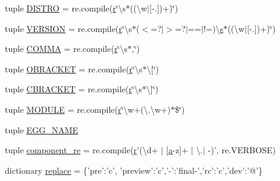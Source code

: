 \begin{DoxyCompactItemize}
\item 
tuple \hyperlink{namespacepkg__resources_a33f8e662c7503913abc27fd1b4005d31}{D\+I\+S\+T\+R\+O} = re.\+compile(\hyperlink{indexexpr_8h_ac434fd11cc2493608d8d91424d60c17e}{r}\char`\"{}\textbackslash{}s$\ast$((\textbackslash{}w$\vert$\mbox{[}-\/.\mbox{]})+)\char`\"{})
\item 
tuple \hyperlink{namespacepkg__resources_a74c55e2ef7e84f92141094b05d526991}{V\+E\+R\+S\+I\+O\+N} = re.\+compile(\hyperlink{indexexpr_8h_ac434fd11cc2493608d8d91424d60c17e}{r}\char`\"{}\textbackslash{}s$\ast$($<$=?$\vert$$>$=?$\vert$==$\vert$!=)\textbackslash{}\hyperlink{indexexpr_8h_ae024b0db549122b44c349ae28ec990dc}{s}$\ast$((\textbackslash{}w$\vert$\mbox{[}-\/.\mbox{]})+)\char`\"{})
\item 
tuple \hyperlink{namespacepkg__resources_aaa98f1116821e21c7cc32afb9071abb5}{C\+O\+M\+M\+A} = re.\+compile(\hyperlink{indexexpr_8h_ac434fd11cc2493608d8d91424d60c17e}{r}\char`\"{}\textbackslash{}s$\ast$,\char`\"{})
\item 
tuple \hyperlink{namespacepkg__resources_a47cc940535c52e3219e4f740dde2e617}{O\+B\+R\+A\+C\+K\+E\+T} = re.\+compile(\hyperlink{indexexpr_8h_ac434fd11cc2493608d8d91424d60c17e}{r}\char`\"{}\textbackslash{}s$\ast$\textbackslash{}\mbox{[}\char`\"{})
\item 
tuple \hyperlink{namespacepkg__resources_a851dada64542fc49accad5eefbd0b310}{C\+B\+R\+A\+C\+K\+E\+T} = re.\+compile(\hyperlink{indexexpr_8h_ac434fd11cc2493608d8d91424d60c17e}{r}\char`\"{}\textbackslash{}s$\ast$\textbackslash{}\mbox{]}\char`\"{})
\item 
tuple \hyperlink{namespacepkg__resources_aee0791fb8fdb71ab7dc8e286061fbf45}{M\+O\+D\+U\+L\+E} = re.\+compile(\hyperlink{indexexpr_8h_ac434fd11cc2493608d8d91424d60c17e}{r}\char`\"{}\textbackslash{}w+(\textbackslash{}.\textbackslash{}w+)$\ast$\$\char`\"{})
\item 
tuple \hyperlink{namespacepkg__resources_aeabc4fefd5622d5295b6a9230c3f866d}{E\+G\+G\+\_\+\+N\+A\+M\+E}
\item 
tuple \hyperlink{namespacepkg__resources_a8ea25986750b23a826922f840a1f11f3}{component\+\_\+re} = re.\+compile(\hyperlink{indexexpr_8h_ac434fd11cc2493608d8d91424d60c17e}{r}'(\textbackslash{}d+ $\vert$ \mbox{[}\hyperlink{gen__mat5files_8m_aae328bf20413f220e38aec4d95bfd6da}{a}-\/z\mbox{]}+ $\vert$ \textbackslash{}.$\vert$ -\/)', re.\+V\+E\+R\+B\+O\+S\+E)
\item 
dictionary \hyperlink{namespacepkg__resources_a4ed2ad35ad4aae95de76204e256404ab}{replace} = \{'pre'\+:'c', 'preview'\+:'c','-\/'\+:'final-\/','rc'\+:'c','dev'\+:'@'\}
$$
\end{DoxyCompactItemize}
